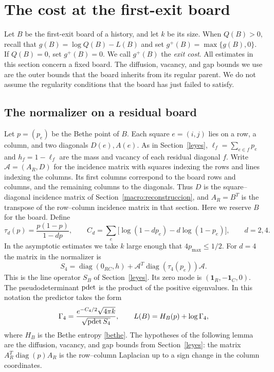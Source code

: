 \section{The cost at the first-exit board}\label{costes}

Let $B$ be the first-exit board of a history, and let $k$ be its size. When $Q(B)>0$, recall that
$g(B)=\log Q(B)-L(B)$ and set $g^+(B)=\max\{g(B),0\}$. If $Q(B)=0$, set $g^+(B)=0$.
We call $g^+(B)$ the \emph{exit cost}. All estimates in this section concern a fixed board.
The diffusion, vacancy, and gap bounds we use are the outer bounds that the board inherits from its
regular parent. We do not assume the regularity conditions that the board has just failed to satisfy.

\subsection{The normalizer on a residual board}\label{costes:normalizador}

Let $p=(p_e)$ be the Bethe point of $B$. Each square $e=(i,j)$
lies on a row, a column, and two diagonals $D(e),A(e)$. As in Section~\ref{leyes},
$\ell_f=\sum_{e\in f}p_e$ and $h_f=1-\ell_f$ are the mass and vacancy of each residual diagonal $f$.
Write $\mathcal A=(A_R,D)$ for the incidence matrix with squares indexing the rows and lines indexing
the columns. Its first columns correspond to the board rows and columns, and the remaining columns
to the diagonals. Thus $D$ is the square--diagonal incidence matrix of
Section~\ref{macro:reconstruccion}, and $A_R=B^T$ is the transpose of the row--column incidence
matrix in that section. Here we reserve $B$ for the board. Define
\[
 \tau_d(p)=\frac{p(1-p)}{1-dp},\qquad
 C_d=\sum_e\bigl[\log(1-dp_e)-d\log(1-p_e)\bigr],\qquad d=2,4 .
\]
In the asymptotic estimates we take $k$ large enough that $4p_{\max}\le1/2$.
For $d=4$ the matrix in the normalizer is
\[
 S_4=\operatorname{diag}(0_{RC},h)+
          \mathcal A^T\operatorname{diag}(\tau_4(p_e))\mathcal A .
\]
This is the line operator $S_B$ of Section~\ref{leyes}. Its zero mode is
$(\mathbf1_R,-\mathbf1_C,0)$. The pseudodeterminant $\operatorname{pdet}$ is the product of the positive
eigenvalues. In this notation the predictor takes the form
\[
 \Gamma_4=\frac{e^{-C_4/2}\sqrt{4\pi k}}{\sqrt{\operatorname{pdet} S_4}},
 \qquad L(B)=H_B(p)+\log\Gamma_4 ,
\]
where $H_B$ is the Bethe entropy \eqref{bethe}. The hypotheses of the following lemma are the
diffusion, vacancy, and gap bounds from Section~\ref{leyes}: the matrix
$A_R^T\operatorname{diag}(p)A_R$ is the row--column Laplacian up to a sign change in the
column coordinates.

